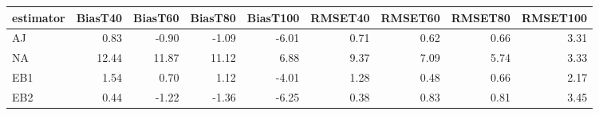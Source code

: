 \begin{table}[ht]
\centering
\begin{tabular}{lrrrrrrrr}
  \toprule
estimator & BiasT40 & BiasT60 & BiasT80 & BiasT100 & RMSET40 & RMSET60 & RMSET80 & RMSET100 \\ 
  \midrule
AJ & 0.83 & -0.90 & -1.09 & -6.01 & 0.71 & 0.62 & 0.66 & 3.31 \\ 
  NA & 12.44 & 11.87 & 11.12 & 6.88 & 9.37 & 7.09 & 5.74 & 3.33 \\ 
  EB1 & 1.54 & 0.70 & 1.12 & -4.01 & 1.28 & 0.48 & 0.66 & 2.17 \\ 
  EB2 & 0.44 & -1.22 & -1.36 & -6.25 & 0.38 & 0.83 & 0.81 & 3.45 \\ 
   \bottomrule
\end{tabular}
\end{table}
